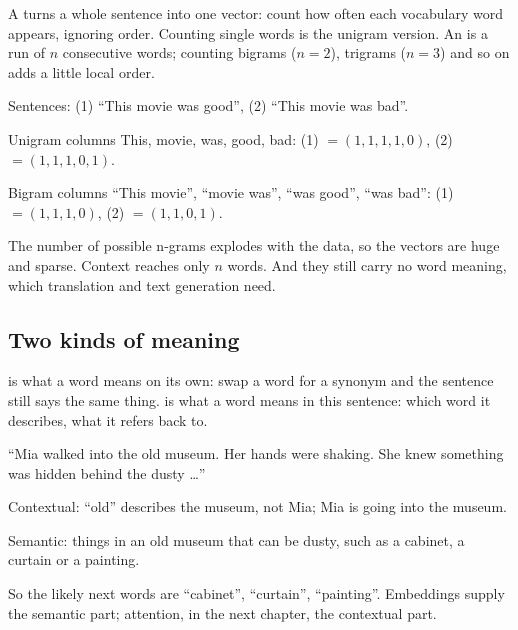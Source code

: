\begin{definition}
A  turns a whole sentence into one vector: count how often each vocabulary word appears, ignoring order. Counting single words is the unigram version. An  is a run of $n$ consecutive words; counting bigrams ($n=2$), trigrams ($n=3$) and so on adds a little local order.
\end{definition}

\begin{example}
Sentences: (1) ``This movie was good'', (2) ``This movie was bad''.
\begin{steps}
  \item Unigram columns This, movie, was, good, bad: (1) $= (1,1,1,1,0)$, (2) $= (1,1,1,0,1)$.
  \item Bigram columns ``This movie'', ``movie was'', ``was good'', ``was bad'': (1) $= (1,1,1,0)$, (2) $= (1,1,0,1)$.
\end{steps}
\end{example}

\begin{result}
The number of possible n-grams explodes with the data, so the vectors are huge and sparse. Context reaches only $n$ words. And they still carry no word meaning, which translation and text generation need.
\end{result}

\subsection*{Two kinds of meaning}

\begin{definition}
 is what a word means on its own: swap a word for a synonym and the sentence still says the same thing.  is what a word means in this sentence: which word it describes, what it refers back to.
\end{definition}

\begin{example}
``Mia walked into the old museum. Her hands were shaking. She knew something was hidden behind the dusty \dots''
\begin{steps}
  \item Contextual: ``old'' describes the museum, not Mia; Mia is going into the museum.
  \item Semantic: things in an old museum that can be dusty, such as a cabinet, a curtain or a painting.
  \item So the likely next words are ``cabinet'', ``curtain'', ``painting''. Embeddings supply the semantic part; attention, in the next chapter, the contextual part.
\end{steps}
\end{example}

